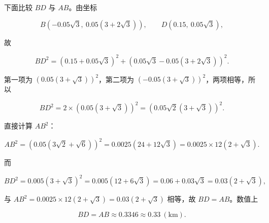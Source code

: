 \begin{answer}
下面比较 $BD$ 与 $AB$。由坐标

\nopagebreak[4]
\[B(-0.05\sqrt3,\ 0.05(3+2\sqrt3)),\qquad
D(0.15,\ 0.05\sqrt3),\]

故

\nopagebreak[4]
\[BD^2
=\left(0.15+0.05\sqrt3\right)^2
+\left(0.05\sqrt3-0.05(3+2\sqrt3)\right)^2 .\]

第一项为 $\left(0.05(3+\sqrt3)\right)^2$，第二项为 $\left(-0.05(3+\sqrt3)\right)^2$，两项相等，所以

\nopagebreak[4]
\[BD^2=2\times\left(0.05(3+\sqrt3)\right)^2
=\left(0.05\sqrt2(3+\sqrt3)\right)^2 .\]

直接计算 $AB^2$：

\nopagebreak[4]
\[AB^2=\left(0.05(3\sqrt2+\sqrt6)\right)^2
=0.0025(24+12\sqrt3)
=0.0025\times12(2+\sqrt3).\]

而

\nopagebreak[4]
\[BD^2=0.005(3+\sqrt3)^2
=0.005(12+6\sqrt3)
=0.06+0.03\sqrt3=0.03(2+\sqrt3),\]

与 $AB^2=0.0025\times12(2+\sqrt3)=0.03(2+\sqrt3)$ 相等，故 $BD=AB$。数值上

\nopagebreak[4]
\[BD=AB\approx0.3346\approx0.33\ (\mathrm{km}).\]


\end{answer}
